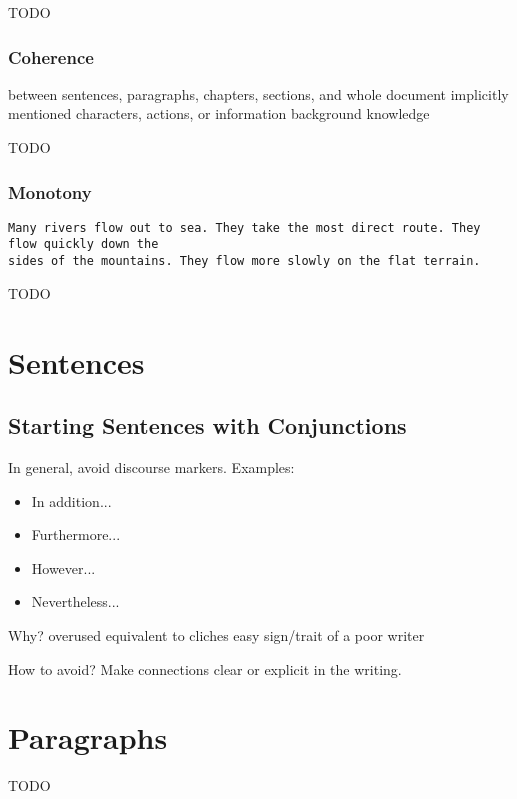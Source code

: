 \documentclass[10pt,a4paper]{book}
\begin{document}
\color{BrickRed}TODO\color{black}


\subsection{Coherence}

between sentences, paragraphs, chapters, sections, and whole document
implicitly mentioned characters, actions, or information
background knowledge

\color{BrickRed}TODO\color{black}


\subsection{Monotony}

\begin{verbatim}
Many rivers flow out to sea. They take the most direct route. They flow quickly down the
sides of the mountains. They flow more slowly on the flat terrain.
\end{verbatim}

\color{BrickRed}TODO\color{black}


\chapter{Sentences}

\section{Starting Sentences with Conjunctions}

In general, avoid discourse markers. Examples:
\begin{itemize}
    \itemsep1pt\parskip0pt
    \item In addition...
    \item Furthermore...
    \item However...
    \item Nevertheless...
\end{itemize}

Why?
overused
equivalent to cliches
easy sign/trait of a poor writer

How to avoid?
Make connections clear or explicit in the writing.


\chapter{Paragraphs}

\color{BrickRed}TODO\color{black}
\end{document}
